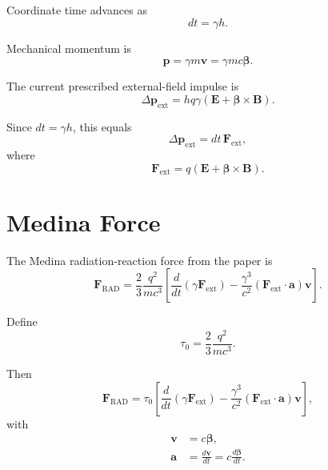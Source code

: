 \documentclass[11pt]{article}
\begin{document}
Coordinate time advances as
\begin{equation}
dt = \gamma h.
\end{equation}

Mechanical momentum is
\begin{equation}
\mathbf{p} = \gamma m \mathbf{v}
            = \gamma m c \boldsymbol{\beta}.
\end{equation}

The current prescribed external-field impulse is
\begin{equation}
\Delta \mathbf{p}_{\mathrm{ext}}
= h q \gamma \left(\mathbf{E} + \boldsymbol{\beta} \times \mathbf{B}\right).
\end{equation}

Since \(dt = \gamma h\), this equals
\begin{equation}
\Delta \mathbf{p}_{\mathrm{ext}}
= dt\,\mathbf{F}_{\mathrm{ext}},
\end{equation}
where
\begin{equation}
\mathbf{F}_{\mathrm{ext}}
= q\left(\mathbf{E} + \boldsymbol{\beta} \times \mathbf{B}\right).
\end{equation}

\section{Medina Force}

The Medina radiation-reaction force from the paper is
\begin{equation}
\mathbf{F}_{\mathrm{RAD}}
=
\frac{2}{3}\frac{q^2}{mc^3}
\left[
\frac{d}{dt}\left(\gamma\mathbf{F}_{\mathrm{ext}}\right)
-
\frac{\gamma^3}{c^2}
\left(\mathbf{F}_{\mathrm{ext}}\cdot \mathbf{a}\right)
\mathbf{v}
\right].
\end{equation}

Define
\begin{equation}
\tau_0 = \frac{2}{3}\frac{q^2}{mc^3}.
\end{equation}

Then
\begin{equation}
\mathbf{F}_{\mathrm{RAD}}
=
\tau_0
\left[
\frac{d}{dt}\left(\gamma\mathbf{F}_{\mathrm{ext}}\right)
-
\frac{\gamma^3}{c^2}
\left(\mathbf{F}_{\mathrm{ext}}\cdot \mathbf{a}\right)
\mathbf{v}
\right],
\end{equation}
with
\begin{align}
\mathbf{v} &= c\boldsymbol{\beta}, \\
\mathbf{a} &= \frac{d\mathbf{v}}{dt}
            = c\frac{d\boldsymbol{\beta}}{dt}.
\end{align}
\end{document}
